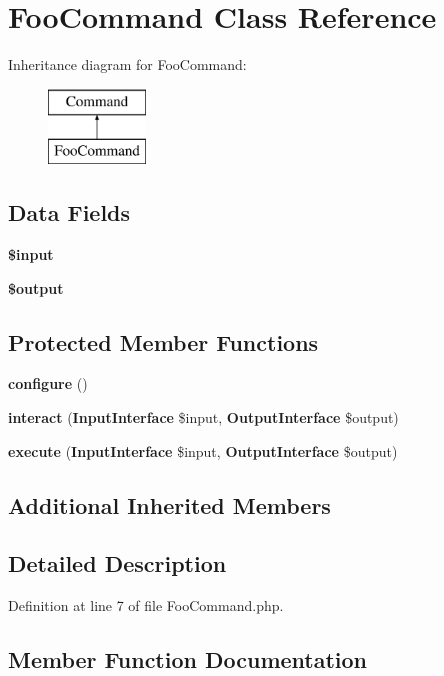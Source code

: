 \section{Foo\+Command Class Reference}
\label{class_foo_command}
Inheritance diagram for Foo\+Command\+:\begin{figure}[H]
\begin{center}
\leavevmode
\includegraphics[height=2.000000cm]{class_foo_command}
\end{center}
\end{figure}
\subsection*{Data Fields}
\begin{DoxyCompactItemize}
\item 
{\bf \$input}
\item 
{\bf \$output}
\end{DoxyCompactItemize}
\subsection*{Protected Member Functions}
\begin{DoxyCompactItemize}
\item 
{\bf configure} ()
\item 
{\bf interact} ({\bf Input\+Interface} \$input, {\bf Output\+Interface} \$output)
\item 
{\bf execute} ({\bf Input\+Interface} \$input, {\bf Output\+Interface} \$output)
\end{DoxyCompactItemize}
\subsection*{Additional Inherited Members}


\subsection{Detailed Description}


Definition at line 7 of file Foo\+Command.\+php.



\subsection{Member Function Documentation}
